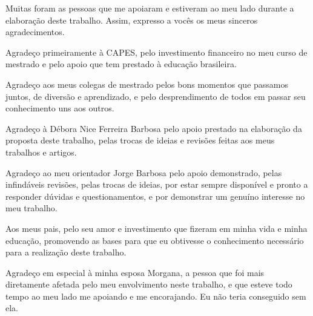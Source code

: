 %
%


\capa
\folhaderosto



%
% 

%
%
\begin{agradecimentos}
Muitas foram as pessoas que me apoiaram e estiveram ao meu lado durante a elaboração deste trabalho. Assim, expresso a vocês os meus sinceros agradecimentos.

Agradeço primeiramente à CAPES, pelo investimento financeiro no meu curso de mestrado e pelo apoio que tem prestado à educação brasileira.

Agradeço aos meus colegas de mestrado pelos bons momentos que passamos juntos, de diversão e aprendizado, e pelo desprendimento de todos em passar seu conhecimento uns aos outros.

Agradeço à Débora Nice Ferreira Barbosa pelo apoio prestado na elaboração da proposta deste trabalho, pelas trocas de ideias e revisões feitas aos meus trabalhos e artigos.

Agradeço ao meu orientador Jorge Barbosa pelo apoio demonstrado, pelas infindáveis revisões, pelas trocas de ideias, por estar sempre disponível e pronto a responder dúvidas e questionamentos, e por demonstrar um genuíno interesse no meu trabalho.

Aos meus pais, pelo seu amor e investimento que fizeram em minha vida e minha educação, promovendo as bases para que eu obtivesse o conhecimento necessário para a realização deste trabalho.

Agradeço em especial à minha esposa Morgana, a pessoa que foi mais diretamente afetada pelo meu envolvimento neste trabalho, e que esteve todo tempo ao meu lado me apoiando e me encorajando. Eu não teria conseguido sem ela.

\end{agradecimentos}

